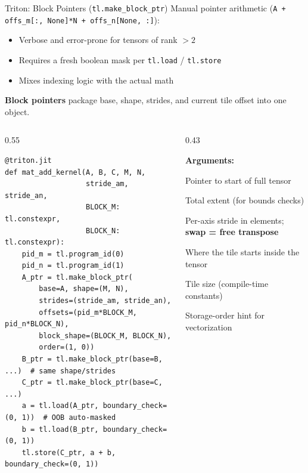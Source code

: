 \begin{frame}[fragile]{Triton: Block Pointers (\texttt{tl.make\_block\_ptr})}
  Manual pointer arithmetic (\texttt{A + offs\_m[:, None]*N + offs\_n[None, :]}):
  \begin{itemize}\itemsep1pt
    \item Verbose and error-prone for tensors of rank $> 2$
    \item Requires a fresh boolean mask per \texttt{tl.load} / \texttt{tl.store}
    \item Mixes indexing logic with the actual math
  \end{itemize}
  \textbf{Block pointers} package base, shape, strides, and current tile offset into one object.

\begin{columns}[T]
  \begin{column}{0.55\textwidth}
\begin{lstlisting}[basicstyle=\ttfamily\scriptsize]
@triton.jit
def mat_add_kernel(A, B, C, M, N,
                   stride_am, stride_an,
                   BLOCK_M: tl.constexpr,
                   BLOCK_N: tl.constexpr):
    pid_m = tl.program_id(0)
    pid_n = tl.program_id(1)
    A_ptr = tl.make_block_ptr(
        base=A, shape=(M, N),
        strides=(stride_am, stride_an),
        offsets=(pid_m*BLOCK_M, pid_n*BLOCK_N),
        block_shape=(BLOCK_M, BLOCK_N),
        order=(1, 0))
    B_ptr = tl.make_block_ptr(base=B, ...)  # same shape/strides
    C_ptr = tl.make_block_ptr(base=C, ...)
    a = tl.load(A_ptr, boundary_check=(0, 1))  # OOB auto-masked
    b = tl.load(B_ptr, boundary_check=(0, 1))
    tl.store(C_ptr, a + b, boundary_check=(0, 1))
\end{lstlisting}
  \end{column}
  \begin{column}{0.43\textwidth}
    {\scriptsize
    \textbf{Arguments:}
    \begin{description}\itemsep1pt
      \item[\texttt{base}] Pointer to start of full tensor
      \item[\texttt{shape}] Total extent (for bounds checks)
      \item[\texttt{strides}] Per-axis stride in elements; \textbf{swap = free transpose}
      \item[\texttt{offsets}] Where the tile starts inside the tensor
      \item[\texttt{block\_shape}] Tile size (compile-time constants)
      \item[\texttt{order}] Storage-order hint for vectorization
    \end{description}

}
\end{column}
\end{columns}
\end{frame}
